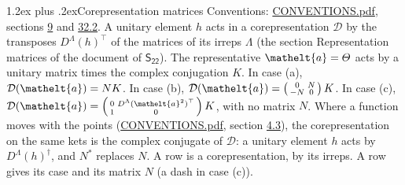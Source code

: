 \documentclass[10pt,a4paper]{article}
\makeatletter
\renewcommand\section{\@startsection{section}{1}{\z@}{-3ex plus -1ex minus -.2ex}%
  {1.2ex plus .2ex}{\normalfont\large\sffamily\bfseries\color{parttitle}}}
\numberwithin{equation}{section}
\newcommand{\eltfont}[1]{{\let\sigma\eltsigma\mathelt{#1}}}
\newcommand{\grp}[1]{\mathsf{#1}}
\newcommand{\elt}[1]{\eltfont{#1}}
\makeatother
\begin{document}
\section{Corepresentation matrices}\label{s:corep_matrices}
Conventions: \href{../../CONVENTIONS.pdf}{CONVENTIONS.pdf}, sections \href{../../../rotation/CONVENTIONS.pdf\#conv.9}{9} and \href{../../CONVENTIONS.pdf\#conv.32.2}{32.2}.
A unitary element $h$ acts in a corepresentation $\mathcal{D}$ by the transposes $D^{\Lambda}(h)^{\top}$ of the matrices of its irreps $\Lambda$ (the section Representation matrices of the document of \href{../../../rotation/data/pdf/S22.pdf}{$\grp{S_{22}}$}). The representative $\elt{a} = \varTheta$ acts by a unitary matrix times the complex conjugation $K$.
In case (a), $\mathcal{D}(\elt{a}) = NK$. In case (b), $\mathcal{D}(\elt{a}) = \left(\begin{smallmatrix} 0 & N \\ -N & 0 \end{smallmatrix}\right) K$. In case (c), $\mathcal{D}(\elt{a}) = \left(\begin{smallmatrix} 0 & D^{\Lambda}(\elt{a}^2)^{\top} \\ 1 & 0 \end{smallmatrix}\right) K$, with no matrix $N$.
Where a function moves with the points (\href{../../CONVENTIONS.pdf}{CONVENTIONS.pdf}, section \href{../../../rotation/CONVENTIONS.pdf\#conv.4.3}{4.3}), the corepresentation on the same kets is the complex conjugate of $\mathcal{D}$: a unitary element $h$ acts by $D^{\Lambda}(h)^{\dagger}$, and $N^{*}$ replaces $N$.
A row is a corepresentation, by its irreps. A row gives its case and its matrix $N$ (a dash in case (c)).
\end{document}
